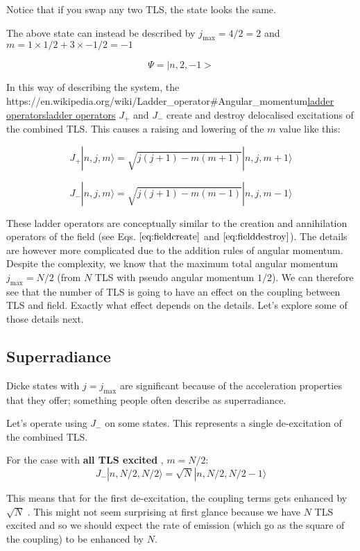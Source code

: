 \documentclass[
]{article}
\let\oldhref\href
\renewcommand{\href}[2]{\ifx#1\urlprefix\oldhref{#1}{#2}\else\uline{\oldhref{#1}{#2}}\fi}
\renewcommand{\[}{\begin{equation}}
\renewcommand{\]}{\end{equation}}
\begin{document}
Notice that if you swap any two TLS, the state looks the same.

The above state can instead be described by \(j_{\max}= 4/2  = 2\) and
\(m = 1\times 1/2 + 3\times -1/2 =-1\)

\[
\Psi = |n,2,-1>
\]

In this way of describing the system, the
\href{https://en.wikipedia.org/wiki/Ladder_operator\#Angular_momentum}{ladder
operators} \(J_{+}\) and \(J_{-}\) create and destroy delocalised
excitations of the combined TLS. This causes a raising and lowering of
the \(m\) value like this:

\[
J_+ |n, j, m\rangle  =  \sqrt{j(j + 1) - m(m + 1)} |n, j, m + 1\rangle
\]

\[
J_- |n, j, m\rangle =  \sqrt{j(j + 1) - m(m - 1)} |n, j, m - 1\rangle
\]

These ladder operators are conceptually similar to the creation and
annihilation operators of the field (see Eqs. \(\ref{eq:fieldcreate}\)
and \(\ref{eq:fielddestroy}\)). The details are however more complicated
due to the addition rules of angular momentum. Despite the complexity,
we know that the maximum total angular momentum \(j_{\max} = N/2\) (from
\(N\) TLS with pseudo angular momentum \(1/2\)). We can therefore see
that the number of TLS is going to have an effect on the coupling
between TLS and field. Exactly what effect depends on the details. Let's
explore some of those details next.

\subsection{Superradiance}\label{superradiance}

Dicke states with \(j=j_{\max}\) are significant because of the
acceleration properties that they offer; something people often describe
as superradiance.

Let's operate using \(J_-\) on some states. This represents a single
de-excitation of the combined TLS.

For the case with \textbf{all TLS excited} , \(m=N/2\): \[
J_- |n, N/2, N/2\rangle  = \sqrt{N} |n, N/2, N/2 - 1\rangle
\]

This means that for the first de-excitation, the coupling terms gets
enhanced by \(\sqrt{N}\) . This might not seem surprising at first
glance because we have \(N\) TLS excited and so we should expect the
rate of emission (which go as the square of the coupling) to be enhanced
by \(N\).
\end{document}
